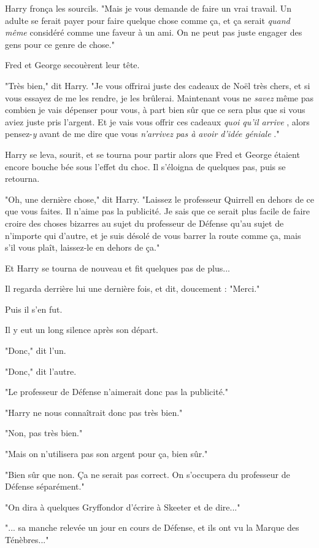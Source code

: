 Harry fronça les sourcils. "Mais je vous demande de faire un vrai travail. Un adulte se ferait payer pour faire quelque chose comme ça, et ça serait \emph{quand même} considéré comme une faveur à un ami. On ne peut pas juste engager des gens pour ce genre de chose."

Fred et George secouèrent leur tête.

"Très bien," dit Harry. "Je vous offrirai juste des cadeaux de Noël très chers, et si vous essayez de me les rendre, je les brûlerai. Maintenant vous ne \emph{savez } même pas combien je vais dépenser pour vous, à part bien sûr que ce sera plus que si vous aviez juste pris l'argent. Et je vais vous offrir ces cadeaux \emph{quoi qu'il arrive} , alors pensez-\emph{y}  avant de me dire que vous \emph{n'arrivez pas à avoir d'idée géniale} ."

Harry se leva, sourit, et se tourna pour partir alors que Fred et George étaient encore bouche bée sous l'effet du choc. Il s'éloigna de quelques pas, puis se retourna.

"Oh, une dernière chose," dit Harry. "Laissez le professeur Quirrell en dehors de ce que vous faites. Il n'aime pas la publicité. Je sais que ce serait plus facile de faire croire des choses bizarres au sujet du professeur de Défense qu'au sujet de n'importe qui d'autre, et je suis désolé de vous barrer la route comme ça, mais s'il vous plaît, laissez-le en dehors de ça."

Et Harry se tourna de nouveau et fit quelques pas de plus...

Il regarda derrière lui une dernière fois, et dit, doucement : "Merci."

Puis il s'en fut.

Il y eut un long silence après son départ.

"Donc," dit l'un.

"Donc," dit l'autre.

"Le professeur de Défense n'aimerait donc pas la publicité."

"Harry ne nous connaîtrait donc pas très bien."

"Non, pas très bien."

"Mais on n'utilisera pas son argent pour ça, bien sûr."

"Bien sûr que non. Ça ne serait pas correct. On s'occupera du professeur de Défense séparément."

"On dira à quelques Gryffondor d'écrire à Skeeter et de dire..."

"... sa manche relevée un jour en cours de Défense, et ils ont vu la Marque des Ténèbres..."

